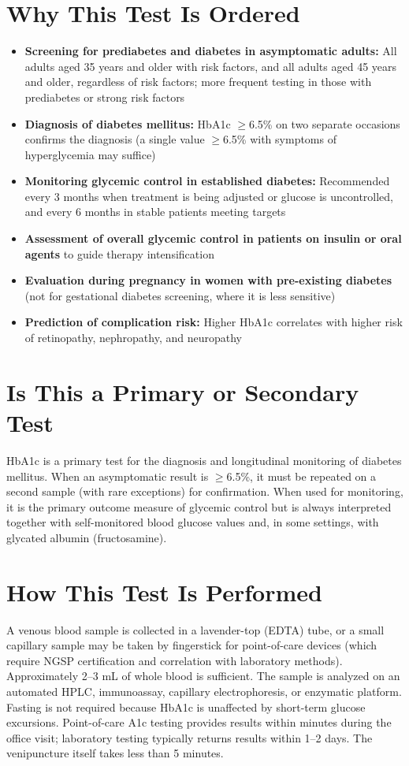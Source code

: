 \section*{Why This Test Is Ordered}
\begin{itemize}
  \item \textbf{Screening for prediabetes and diabetes in asymptomatic adults:} All adults aged 35 years and older with risk factors, and all adults aged 45 years and older, regardless of risk factors; more frequent testing in those with prediabetes or strong risk factors
  \item \textbf{Diagnosis of diabetes mellitus:} HbA1c $\geq$6.5\% on two separate occasions confirms the diagnosis (a single value $\geq$6.5\% with symptoms of hyperglycemia may suffice)
  \item \textbf{Monitoring glycemic control in established diabetes:} Recommended every 3 months when treatment is being adjusted or glucose is uncontrolled, and every 6 months in stable patients meeting targets
  \item \textbf{Assessment of overall glycemic control in patients on insulin or oral agents} to guide therapy intensification
  \item \textbf{Evaluation during pregnancy in women with pre-existing diabetes} (not for gestational diabetes screening, where it is less sensitive)
  \item \textbf{Prediction of complication risk:} Higher HbA1c correlates with higher risk of retinopathy, nephropathy, and neuropathy
\end{itemize}

\section*{Is This a Primary or Secondary Test}
HbA1c is a primary test for the diagnosis and longitudinal monitoring of diabetes mellitus. When an asymptomatic result is $\geq$6.5\%, it must be repeated on a second sample (with rare exceptions) for confirmation. When used for monitoring, it is the primary outcome measure of glycemic control but is always interpreted together with self-monitored blood glucose values and, in some settings, with glycated albumin (fructosamine).

\section*{How This Test Is Performed}
A venous blood sample is collected in a lavender-top (EDTA) tube, or a small capillary sample may be taken by fingerstick for point-of-care devices (which require NGSP certification and correlation with laboratory methods). Approximately 2--3 mL of whole blood is sufficient. The sample is analyzed on an automated HPLC, immunoassay, capillary electrophoresis, or enzymatic platform. Fasting is not required because HbA1c is unaffected by short-term glucose excursions. Point-of-care A1c testing provides results within minutes during the office visit; laboratory testing typically returns results within 1--2 days. The venipuncture itself takes less than 5 minutes.

